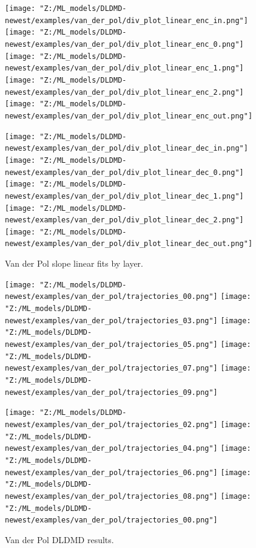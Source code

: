 \begin{figure}[h!p]
    \centering
    \begin{minipage}{.5\textwidth}
        \texttt{[image: "Z:/ML\_models/DLDMD-newest/examples/van\_der\_pol/div\_plot\_linear\_enc\_in.png"]} 
        \texttt{[image: "Z:/ML\_models/DLDMD-newest/examples/van\_der\_pol/div\_plot\_linear\_enc\_0.png"]} 
        \texttt{[image: "Z:/ML\_models/DLDMD-newest/examples/van\_der\_pol/div\_plot\_linear\_enc\_1.png"]} 
        \texttt{[image: "Z:/ML\_models/DLDMD-newest/examples/van\_der\_pol/div\_plot\_linear\_enc\_2.png"]} 
        \texttt{[image: "Z:/ML\_models/DLDMD-newest/examples/van\_der\_pol/div\_plot\_linear\_enc\_out.png"]} 
    \end{minipage}%
    \begin{minipage}{.5\textwidth}
        \texttt{[image: "Z:/ML\_models/DLDMD-newest/examples/van\_der\_pol/div\_plot\_linear\_dec\_in.png"]} 
        \texttt{[image: "Z:/ML\_models/DLDMD-newest/examples/van\_der\_pol/div\_plot\_linear\_dec\_0.png"]} 
        \texttt{[image: "Z:/ML\_models/DLDMD-newest/examples/van\_der\_pol/div\_plot\_linear\_dec\_1.png"]} 
        \texttt{[image: "Z:/ML\_models/DLDMD-newest/examples/van\_der\_pol/div\_plot\_linear\_dec\_2.png"]} 
        \texttt{[image: "Z:/ML\_models/DLDMD-newest/examples/van\_der\_pol/div\_plot\_linear\_dec\_out.png"]} 
    \end{minipage}
    \caption{Van der Pol slope linear fits by layer.}
    \label{fig:van der pol linear fits all layers}
\end{figure}

\begin{figure}[!htbp]
    \centering
    \begin{minipage}{.5\textwidth}
        \texttt{[image: "Z:/ML\_models/DLDMD-newest/examples/van\_der\_pol/trajectories\_00.png"]} 
        \texttt{[image: "Z:/ML\_models/DLDMD-newest/examples/van\_der\_pol/trajectories\_03.png"]} 
        \texttt{[image: "Z:/ML\_models/DLDMD-newest/examples/van\_der\_pol/trajectories\_05.png"]} 
        \texttt{[image: "Z:/ML\_models/DLDMD-newest/examples/van\_der\_pol/trajectories\_07.png"]} 
        \texttt{[image: "Z:/ML\_models/DLDMD-newest/examples/van\_der\_pol/trajectories\_09.png"]} 
    \end{minipage}%
    \begin{minipage}{.5\textwidth}
        \texttt{[image: "Z:/ML\_models/DLDMD-newest/examples/van\_der\_pol/trajectories\_02.png"]} 
        \texttt{[image: "Z:/ML\_models/DLDMD-newest/examples/van\_der\_pol/trajectories\_04.png"]} 
        \texttt{[image: "Z:/ML\_models/DLDMD-newest/examples/van\_der\_pol/trajectories\_06.png"]} 
        \texttt{[image: "Z:/ML\_models/DLDMD-newest/examples/van\_der\_pol/trajectories\_08.png"]} 
        \texttt{[image: "Z:/ML\_models/DLDMD-newest/examples/van\_der\_pol/trajectories\_00.png"]} 
    \end{minipage}
    \caption{Van der Pol DLDMD results.}
    \label{fig:van der pol DLDMD results}
\end{figure}

